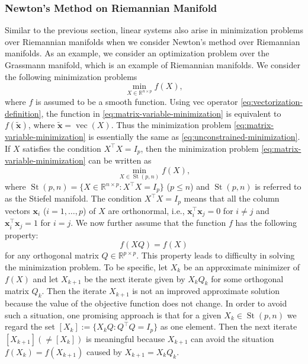 \subsubsection{{Newton's Method on Riemannian Manifold}}\label{subsec:riemannian-newton}
{Similar to the previous section, linear systems also arise in minimization problems over Riemannian manifolds when we consider Newton's method over Riemannian manifolds. As an example, we consider an optimization problem over the Grassmann manifold, which is an example of Riemannian manifolds. We consider the following minimization problems}
\begin{equation}\label{eq:matrix-variable-minimization}
\min_{X\in\mathbb{R}^{n\times p}}f(X),
\end{equation}
{where $f$ is assumed to be a smooth function. Using vec operator \eqref{eq:vectorization-definition}, the function in \eqref{eq:matrix-variable-minimization} is equivalent to $f(\widetilde{\boldsymbol{x}})$, where $\widetilde{\boldsymbol{x}}=\operatorname{vec}(X)$. Thus the minimization problem \eqref{eq:matrix-variable-minimization} is essentially the same as \eqref{eq:unconstrained-minimization}. If $X$ satisfies the condition $X^{\top}X=I_p$, then the minimization problem \eqref{eq:matrix-variable-minimization} can be written as}
\begin{equation}\label{eq:stiefel-minimization}
\min_{X\in\operatorname{St}(p,n)}f(X),
\end{equation}
{where $\operatorname{St}(p,n)=\{X\in\mathbb{R}^{n\times p}:X^{\top}X=I_p\}$ ($p\le n$) and $\operatorname{St}(p,n)$ is referred to as the Stiefel manifold. The condition $X^{\top}X=I_p$ means that all the column vectors $\boldsymbol{x}_i$ ($i=1,\ldots,p$) of $X$ are orthonormal, i.e., $\boldsymbol{x}_i^{\top}\boldsymbol{x}_j=0$ for $i\ne j$ and $\boldsymbol{x}_i^{\top}\boldsymbol{x}_j=1$ for $i=j$. We now further assume that the function $f$ has the following property:}
\begin{equation}\label{eq:orthogonal-invariance}
f(XQ)=f(X)
\end{equation}
{for any orthogonal matrix $Q\in\mathbb{R}^{p\times p}$. This property leads to difficulty in solving the minimization problem. To be specific, let $X_k$ be an approximate minimizer of $f(X)$ and let $X_{k+1}$ be the next iterate given by $X_kQ_k$ for some orthogonal matrix $Q_k$. Then the iterate $X_{k+1}$ is not an improved approximate solution because the value of the objective function does not change. In order to avoid such a situation, one promising approach is that for a given $X_k\in\operatorname{St}(p,n)$ we regard the set $[X_k]:=\{X_kQ:Q^{\top}Q=I_p\}$ as one element. Then the next iterate $[X_{k+1}](\ne[X_k])$ is meaningful because $X_{k+1}$ can avoid the situation $f(X_k)=f(X_{k+1})$ caused by $X_{k+1}=X_kQ_k$.}
